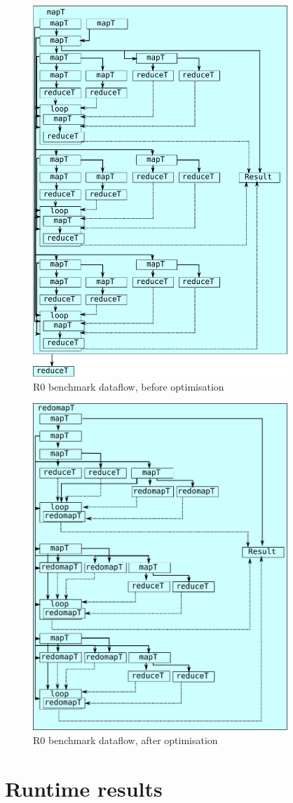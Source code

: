 \begin{figure}
\begin{center}
\includegraphics[width=9.6cm]{img/CalibLexiFi-unfused.pdf}
\end{center}
\caption{R0 benchmark dataflow, before optimisation}
\label{fig:r2-dataflow-unfused}
\end{figure}

\begin{figure}
\begin{center}
\includegraphics[width=9.6cm]{img/CalibLexiFi-fused.pdf}
\end{center}
\caption{R0 benchmark dataflow, after optimisation}
\label{fig:r2-dataflow-fused}
\end{figure}

\section{Runtime results}
\label{sec:runtime-results}

